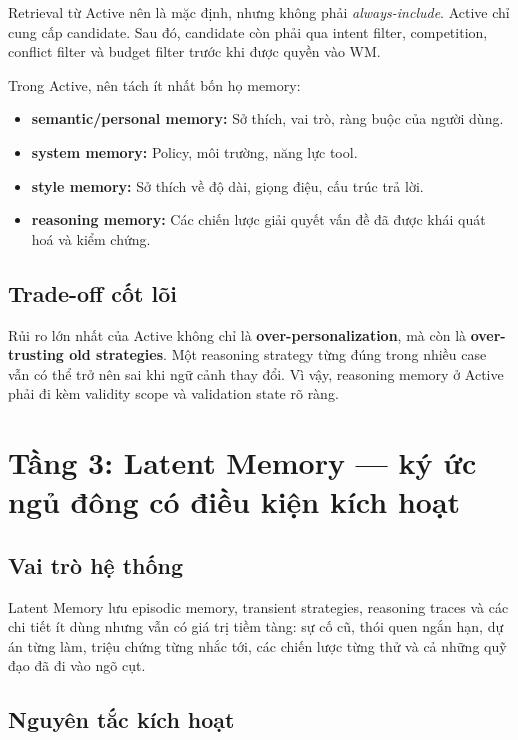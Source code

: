 \documentclass[a4paper,12pt]{article}
\begin{document}
Retrieval từ Active nên là mặc định, nhưng không phải \emph{always-include}. Active chỉ cung cấp candidate. Sau đó, candidate còn phải qua intent filter, competition, conflict filter và budget filter trước khi được quyền vào WM.

Trong Active, nên tách ít nhất bốn họ memory:
\begin{itemize}
    \item \textbf{semantic/personal memory:} Sở thích, vai trò, ràng buộc của người dùng.
    \item \textbf{system memory:} Policy, môi trường, năng lực tool.
    \item \textbf{style memory:} Sở thích về độ dài, giọng điệu, cấu trúc trả lời.
    \item \textbf{reasoning memory:} Các chiến lược giải quyết vấn đề đã được khái quát hoá và kiểm chứng.
\end{itemize}

\subsection*{Trade-off cốt lõi}

Rủi ro lớn nhất của Active không chỉ là \textbf{over-personalization}, mà còn là \textbf{over-trusting old strategies}. Một reasoning strategy từng đúng trong nhiều case vẫn có thể trở nên sai khi ngữ cảnh thay đổi. Vì vậy, reasoning memory ở Active phải đi kèm validity scope và validation state rõ ràng.

\section{Tầng 3: Latent Memory --- ký ức ngủ đông có điều kiện kích hoạt}

\subsection*{Vai trò hệ thống}

Latent Memory lưu episodic memory, transient strategies, reasoning traces và các chi tiết ít dùng nhưng vẫn có giá trị tiềm tàng: sự cố cũ, thói quen ngắn hạn, dự án từng làm, triệu chứng từng nhắc tới, các chiến lược từng thử và cả những quỹ đạo đã đi vào ngõ cụt.

\subsection*{Nguyên tắc kích hoạt}
\end{document}
